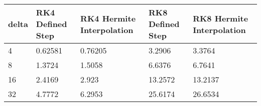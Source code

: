 \begin{tabular}{lllll}
delta & RK4 Defined Step & RK4 Hermite Interpolation & RK8 Defined Step & RK8 Hermite Interpolation \\ 
\hline 
4 & 0.62581 & 0.76205 & 3.2906 & 3.3764 \\ 
8 & 1.3724 & 1.5058 & 6.6376 & 6.7641 \\ 
16 & 2.4169 & 2.923 & 13.2572 & 13.2137 \\ 
32 & 4.7772 & 6.2953 & 25.6174 & 26.6534 \\ 
\hline 
\end{tabular}